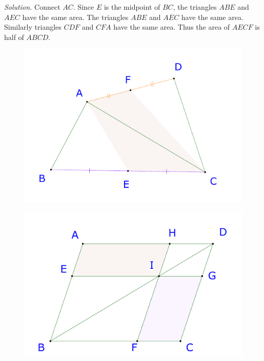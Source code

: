 \begin{multicols}{2}
\begin{figure}[H]
		\vspace*{-20pt}
	\end{figure}
	\textit{Solution.}
	Connect $AC.$ Since $E$ is the midpoint of $BC$, the triangles $ABE$ and $AEC$ have the same area. The triangles $ABE$ and $AEC$ have the same area.
	Similarly triangles $CDF$ and $CFA$ have the same area. Thus the area of $AECF$ is half of $ABCD.$
	\begin{figure}[H]
		\vspace*{-5pt}
		\centering
		\captionsetup{labelformat= empty, justification=centering}
		\includegraphics[width= 1\linewidth]{23-24-s3-i-p2-s.pdf}
		\vspace*{-10pt}
	\end{figure}
	\begin{figure}[H]
		\vspace*{-5pt}
		\centering
		\captionsetup{labelformat= empty, justification=centering}
		\includegraphics[width= 1\linewidth]{23-24-s3-i-p3.pdf}

\end{figure}
\end{multicols}
